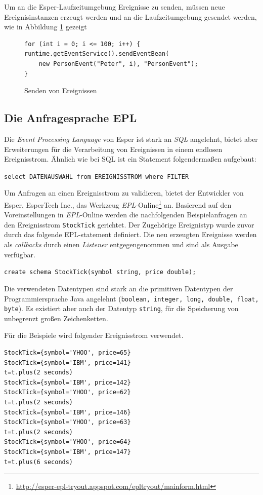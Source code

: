 \documentclass{acm_proc_article-sp}
\begin{document}
Um an die Esper-Laufzeitumgebung Ereignisse zu senden, müssen neue Ereignisinstanzen 
erzeugt werden und an die Laufzeitumgebung gesendet werden, wie in Abbildung \ref{java:03}
gezeigt

\begin{figure}[H]    
\begin{verbatim}
for (int i = 0; i <= 100; i++) {
runtime.getEventService().sendEventBean(
    new PersonEvent("Peter", i), "PersonEvent");
}
\end{verbatim}
\caption{Senden von Ereignissen}
\label{java:03}
\end{figure}

\subsection{Die Anfragesprache EPL}\label{kap:epl}
\vspace{0.1cm}
Die \textit{Event Processing Language} von Esper ist stark an \textit{SQL} angelehnt, 
bietet aber Erweiterungen für die Verarbeitung von Ereignissen in einem endlosen 
Ereignisstrom. Ähnlich wie bei SQL ist ein Statement folgendermaßen aufgebaut:

\texttt{select DATENAUSWAHL from EREIGNISSTROM where FILTER}

Um Anfragen an einen Ereignisstrom zu validieren, bietet der Entwickler von Esper, 
EsperTech Inc., das Werkzeug 
\textit{EPL}-Online\footnote{\url{http://esper-epl-tryout.appspot.com/epltryout/mainform.html}}
an. Basierend auf den 
Voreinstellungen in \textit{EPL}-Online werden die nachfolgenden Beispielanfragen an den 
Ereignisstrom \texttt{StockTick} gerichtet. Der Zugehörige Ereignistyp wurde zuvor durch 
das folgende EPL-statement definiert. Die neu erzeugten Ereignisse werden als 
\textit{callbacks} durch einen \textit{Listener} entgegengenommen und sind als Ausgabe 
verfügbar.

\texttt{create schema StockTick(symbol string, price double);}

Die verwendeten Datentypen sind stark an die primitiven Datentypen der Programmiersprache 
Java angelehnt (\texttt{boolean, integer, long, double, float, byte}). Es existiert aber 
auch der Datentyp \texttt{string}, für die Speicherung von unbegrenzt großen 
Zeichenketten.

Für die Beispiele wird folgender Ereignisstrom verwendet.

\begin{verbatim}
StockTick={symbol='YHOO', price=65}
StockTick={symbol='IBM', price=141}
t=t.plus(2 seconds)
StockTick={symbol='IBM', price=142}
StockTick={symbol='YHOO', price=62}
t=t.plus(2 seconds)
StockTick={symbol='IBM', price=146}
StockTick={symbol='YHOO', price=63}
t=t.plus(2 seconds)
StockTick={symbol='YHOO', price=64}
StockTick={symbol='IBM', price=147}
t=t.plus(6 seconds)
\end{verbatim}
\end{document}
